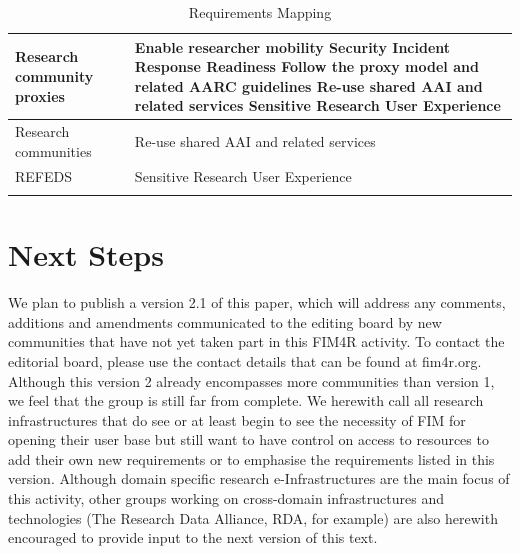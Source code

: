 \documentclass[fleqn,10pt]{wlscirep}
\begin{document}
{\begin{center}
\begin{longtable}{|p{}|p{}|}
Research community proxies & 
Enable researcher mobility\newline
Security Incident Response Readiness\newline
Follow the proxy model and related AARC guidelines\newline
Re-use shared AAI and related services\newline
Sensitive Research User Experience \\ \hline 

Research communities & 
Re-use shared AAI and related services\\ \hline

REFEDS & 
Sensitive Research User Experience \\ \hline

\caption{Requirements Mapping}
\label{tab:mapping}
\end{longtable}
\end{center}

\section{Next Steps}
We plan to publish a version 2.1 of this paper, which will address any comments, additions and amendments communicated to the editing board by new communities that have not yet taken part in this FIM4R activity. To contact the editorial board, please use the contact details that can be found at fim4r.org. Although this version 2 already encompasses more communities than version 1, we feel that the group is still far from complete. We herewith call all research infrastructures that do see or at least begin to see the necessity of FIM for opening their user base but still want to have control on access to resources to add their own new requirements or to emphasise the requirements listed in this version. Although domain specific research e-Infrastructures are the main focus of this activity, other groups working on cross-domain infrastructures and technologies (The Research Data Alliance, RDA, for example) are also herewith encouraged to provide input to the next version of this text. 


\renewcommand{\bibname}{References}
\begin{flushleft}

\end{flushleft}

}
\end{document}
